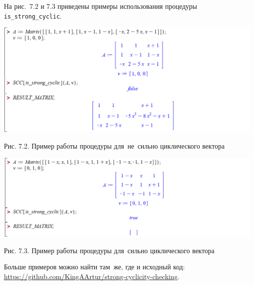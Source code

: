 На рис.~7.2 и 7.3 приведены примеры использования процедуры \verb|is_strong_cyclic|.


\begin{center}
    \includegraphics[scale=0.6]{pictures/maple_example4.png}

    \small
    Рис. 7.2. Пример работы процедуры для~не~сильно циклического вектора
\end{center}


\begin{center}
    \includegraphics[scale=0.6]{pictures/maple_example1.png}

    \small
    Рис. 7.3. Пример работы процедуры для~сильно циклического вектора
\end{center}

Больше примеров можно найти там~же, где и исходный код:
\url{https://github.com/KingAArtur/strong-cyclicity-checking}.